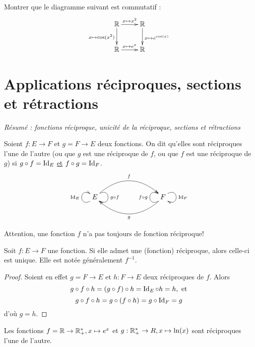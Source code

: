 \begin{exercice} Montrer que le diagramme suivant est commutatif :
\[\xymatrix{
\R  \ar[r]^{x\mapsto x^2} \ar[d]_{x\mapsto \cos(x^2)} & \R  \ar[d]^{x\mapsto e^{\cos(x)}}\\
\R  \ar[r]^{x\mapsto e^x}& \R 
}\]
\end{exercice}




\section{Applications réciproques, sections et rétractions}

\emph{Résumé : fonctions réciproque, unicité de la réciproque, sections et rétractions}


\begin{definition}
Soient $f : E\to F$ et $g = F\to E$ deux fonctions. On dit qu'elles sont réciproques l'une de l'autre (ou que $g$ est une réciproque de $f$, ou que $f$ est une réciproque de $g$) si $g\circ f = \operatorname{Id}_E$ \underline{et} $f\circ g = \operatorname{Id}_F$. 
\[
\xymatrix{
 E \ar@(dl,ul)^{\Id_E} \ar@/^2pc/[rrr]^{f} \ar@(ur,dr)^{g\circ f} 
& & & 
\ar@/^2pc/[lll]^{g} \ar@(dl,ul)^{f\circ g} F \ar@(ur,dr)^{\Id_F}
}
\]
\end{definition}



Attention, une fonction $f$ n'a pas toujours de fonction réciproque!

\begin{proposition} Soit $f : E\to F$ une fonction. Si elle admet une (fonction) réciproque, alors celle-ci est unique. Elle est notée généralement $f^{-1}$.
\end{proposition}
\begin{proof}
Soient en effet $g = F\to E$ et $h : F \to E$ deux réciproques de $f$. Alors
\[
g\circ  f \circ h = (g\circ f) \circ h = \operatorname{Id}_E \circ h = h, \text{ et}
\]
\[
g\circ  f \circ h = g\circ (f \circ h) = g \circ \operatorname{Id}_F = g
\]
d'où $g=h$.
\end{proof}



\begin{exemple}
Les fonctions $f = \mathbb{R}\to \mathbb{R}_+^*, x\mapsto e^x$ et $g : \mathbb{R}_+^*\to R, x\mapsto \ln(x)$ sont réciproques l'une de l'autre.
\end{exemple}


